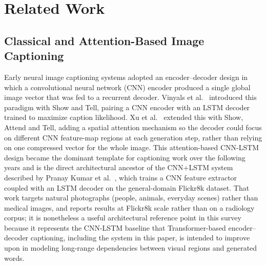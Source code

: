 %

\section{Related Work}
\label{sec:related}

\subsection{Classical and Attention-Based Image Captioning}
Early neural image captioning systems adopted an encoder--decoder design in which a convolutional neural network (CNN) encoder produced a single global image vector that was fed to a recurrent decoder. Vinyals et al.~\cite{vinyals2015show} introduced this paradigm with Show and Tell, pairing a CNN encoder with an LSTM decoder trained to maximize caption likelihood. Xu et al.~\cite{xu2015show} extended this with Show, Attend and Tell, adding a spatial attention mechanism so the decoder could focus on different CNN feature-map regions at each generation step, rather than relying on one compressed vector for the whole image. This attention-based CNN-LSTM design became the dominant template for captioning work over the following years and is the direct architectural ancestor of the CNN+LSTM system described by Pranay Kumar et al.~\cite{ijraset2022}, which trains a CNN feature extractor coupled with an LSTM decoder on the general-domain Flickr8k dataset. That work targets natural photographs (people, animals, everyday scenes) rather than medical images, and reports results at Flickr8k scale rather than on a radiology corpus; it is nonetheless a useful architectural reference point in this survey because it represents the CNN-LSTM baseline that Transformer-based encoder--decoder captioning, including the system in this paper, is intended to improve upon in modeling long-range dependencies between visual regions and generated words.

